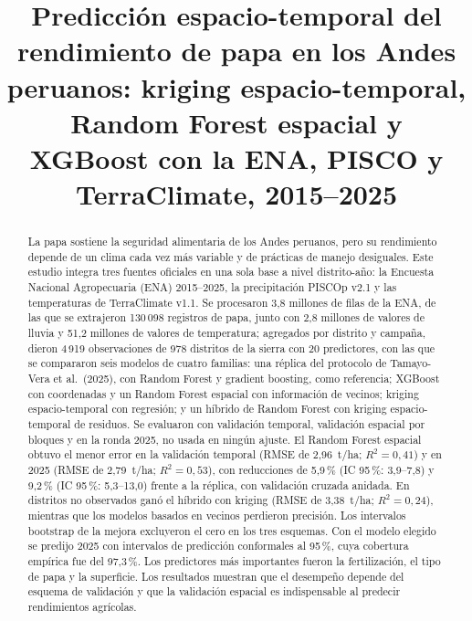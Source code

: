\documentclass[conference,letterpaper]{IEEEtran}
\begin{document}
\title{Predicción espacio-temporal del rendimiento de papa en los Andes peruanos: kriging espacio-temporal, Random Forest espacial y XGBoost con la ENA, PISCO y TerraClimate, 2015--2025}

\author{
}

\maketitle

\begin{abstract}
La papa sostiene la seguridad alimentaria de los Andes peruanos, pero su rendimiento depende de un clima cada vez más variable y de prácticas de manejo desiguales. Este estudio integra tres fuentes oficiales en una sola base a nivel distrito-año: la Encuesta Nacional Agropecuaria (ENA) 2015--2025, la precipitación PISCOp v2.1 y las temperaturas de TerraClimate v1.1. Se procesaron 3,8 millones de filas de la ENA, de las que se extrajeron 130\,098 registros de papa, junto con 2,8 millones de valores de lluvia y 51,2 millones de valores de temperatura; agregados por distrito y campaña, dieron 4\,919 observaciones de 978 distritos de la sierra con 20 predictores, con las que se compararon seis modelos de cuatro familias: una réplica del protocolo de Tamayo-Vera et al.\ (2025), con Random Forest y gradient boosting, como referencia; XGBoost con coordenadas y un Random Forest espacial con información de vecinos; kriging espacio-temporal con regresión; y un híbrido de Random Forest con kriging espacio-temporal de residuos. Se evaluaron con validación temporal, validación espacial por bloques y en la ronda 2025, no usada en ningún ajuste. El Random Forest espacial obtuvo el menor error en la validación temporal (RMSE de 2,96~t/ha; $R^2=0{,}41$) y en 2025 (RMSE de 2,79~t/ha; $R^2=0{,}53$), con reducciones de 5,9\,\% (IC 95\,\%: 3,9--7,8) y 9,2\,\% (IC 95\,\%: 5,3--13,0) frente a la réplica, con validación cruzada anidada. En distritos no observados ganó el híbrido con kriging (RMSE de 3,38~t/ha; $R^2=0{,}24$), mientras que los modelos basados en vecinos perdieron precisión. Los intervalos bootstrap de la mejora excluyeron el cero en los tres esquemas. Con el modelo elegido se predijo 2025 con intervalos de predicción conformales al 95\,\%, cuya cobertura empírica fue del 97,3\,\%. Los predictores más importantes fueron la fertilización, el tipo de papa y la superficie. Los resultados muestran que el desempeño depende del esquema de validación y que la validación espacial es indispensable al predecir rendimientos agrícolas.
\end{abstract}
\end{document}

